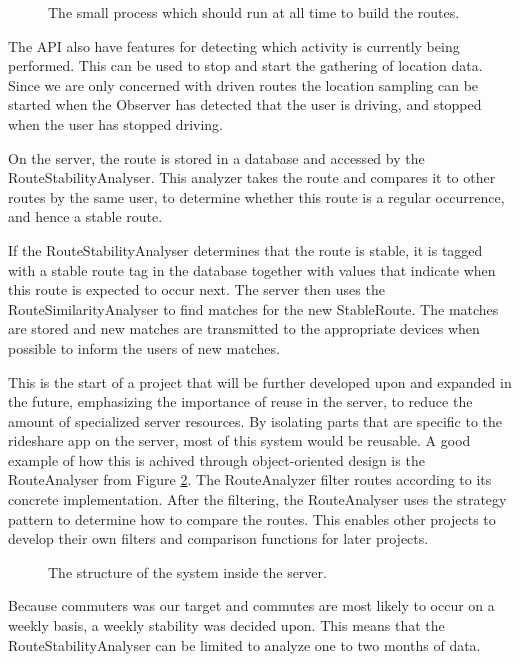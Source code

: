 \begin{figure}[h]
	\centering
	
	\caption{The small process which should run at all time to build the routes.}
	\label{fig:classDiagramSprint1Observer}
\end{figure}

The API also have features for detecting which activity is currently being performed.
This can be used to stop and start the gathering of location data.
Since we are only concerned with driven routes the location sampling can be started when the Observer has detected that the user is driving, and stopped when the user has stopped driving.

On the server, the route is stored in a database and accessed by the RouteStabilityAnalyser.
This analyzer takes the route and compares it to other routes by the same user, to determine whether this route is a regular occurrence, and hence a stable route.

If the RouteStabilityAnalyser determines that the route is stable, it is tagged with a stable route tag in the database together with values that indicate when this route is expected to occur next.
The server then uses the RouteSimilarityAnalyser to find matches for the new StableRoute.
The matches are stored and new matches are transmitted to the appropriate devices when possible to inform the users of new matches.

%	

This is the start of a project that will be further developed upon and expanded in the future, emphasizing the importance of reuse in the server, to reduce the amount of specialized server resources.
By isolating parts that are specific to the rideshare app on the server, most of this system would be reusable.
A good example of how this is achived through object-oriented design is the RouteAnalyser from Figure \ref{fig:classDiagramSprint1Server}.
The RouteAnalyzer filter routes according to its concrete implementation.
After the filtering, the RouteAnalyser uses the strategy pattern to determine how to compare the routes.
This enables other projects to develop their own filters and comparison functions for later projects.

\begin{figure}[h!]
	\centering
	
	\caption{The structure of the system inside the server.}
	\label{fig:classDiagramSprint1Server}
\end{figure}

Because commuters was our target and commutes are most likely to occur on a weekly basis, a weekly stability was decided upon.
This means that the RouteStabilityAnalyser can be limited to analyze one to two months of data.